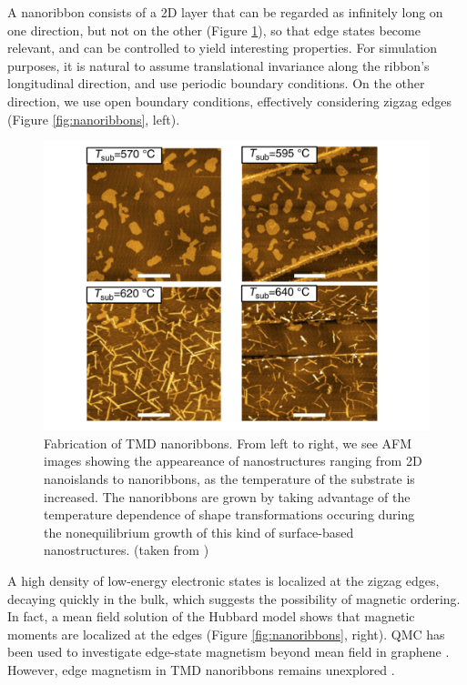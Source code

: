\documentclass[10pt, twocolumn, twoside]{article}
\begin{document}
A nanoribbon consists of a 2D layer that can be regarded as infinitely long on one direction, but not on the other (Figure \ref{fig:fabrication}), so that edge states become relevant, and can be controlled to yield interesting properties. For simulation purposes, it is natural to assume translational invariance along the ribbon's longitudinal direction, and use periodic boundary conditions. On the other direction, we use open boundary conditions, effectively considering zigzag edges (Figure \ref{fig:nanoribbons}, left).

\begin{figure}
\centering
\includegraphics[scale = 0.18]{fabrication.png}
\caption{Fabrication of TMD nanoribbons. From left to right, we see AFM images showing the appeareance of nanostructures ranging from 2D nanoislands to nanoribbons, as the temperature of the substrate is increased. The nanoribbons are grown by taking advantage of the temperature dependence of shape transformations occuring during the nonequilibrium growth of this kind of surface-based nanostructures. (taken from \cite{chen}) \label{fig:fabrication}}
\end{figure}
   
A high density of low-energy electronic states is localized at the zigzag edges, decaying quickly in the bulk, which suggests the possibility of magnetic ordering. In fact, a mean field solution of the Hubbard model shows that magnetic moments are localized at the edges \cite{yazyev} (Figure \ref{fig:nanoribbons}, right). QMC has been used to investigate edge-state magnetism beyond mean field in graphene \cite{qmc_results1, qmc_results2, qmc_results3, qmc_results4, qmc_results5}. However, edge magnetism in TMD nanoribbons remains unexplored \cite{nanoribbon}.
 
\end{document}
